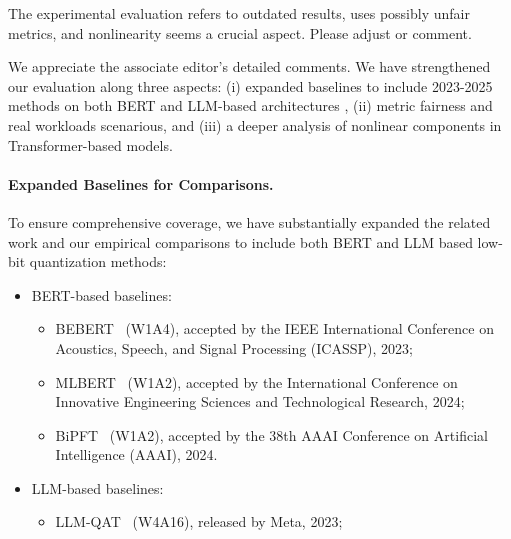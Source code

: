 \begin{revcommentToAssociateEditor}
The experimental evaluation refers to outdated results, uses possibly unfair metrics, and nonlinearity seems a crucial aspect. Please adjust or comment.
\label{com:more_baselines}
\end{revcommentToAssociateEditor}
\begin{revmeta}[]

We appreciate the associate editor's detailed comments. We have strengthened our evaluation along three aspects: (i) expanded baselines to include 2023-2025 methods on both BERT and LLM-based architectures , (ii) metric fairness and real workloads scenarious, and (iii) a deeper analysis of nonlinear components in Transformer-based models. 

\paragraph{Expanded Baselines for Comparisons. }
To ensure comprehensive coverage, we have substantially expanded the related work and our empirical comparisons to include both BERT and LLM based low-bit quantization methods:
\begin{itemize}
    \item BERT-based baselines: 
    \begin{itemize}
        \item BEBERT~\cite{bebert} (W1A4), accepted by the IEEE International Conference on Acoustics, Speech, and Signal Processing (ICASSP), 2023; 
        \item MLBERT~\cite{mlbert} (W1A2), accepted by the International Conference on Innovative Engineering Sciences and Technological Research, 2024; 
        \item BiPFT~\cite{xing2024bipft} (W1A2), accepted by the 38th AAAI Conference on Artificial Intelligence (AAAI), 2024. 
    \end{itemize}
    \item LLM-based baselines:
    \begin{itemize}
        \item LLM-QAT~\cite{llm-qat} (W4A16), released by Meta, 2023; 

\end{itemize}
\end{itemize}
\end{revmeta}

